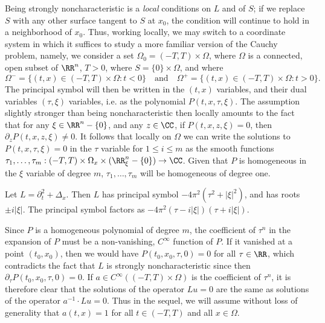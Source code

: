 Being strongly noncharacteristic is a \emph{local} conditions on $L$ and of $S$; if we replace $S$ with any other surface tangent to $S$ at $x_0$, the condition will continue to hold in a neighborhood of $x_0$. Thus, working locally, we may switch to a coordinate system in which it suffices to study a more familiar version of the Cauchy problem, namely, we consider a set $\Omega_0 = (-T,T) \times \Omega$, where $\Omega$ is a connected, open subset of $\RR^n$, $T > 0$, where $S = \{ 0 \} \times \Omega$, and where
%
\[ \Omega^- = \{ (t,x) \in (-T,T) \times \Omega : t < 0 \} \quad\text{and}\quad \Omega^+ = \{ (t,x) \in (-T,T) \times \Omega: t > 0 \}. \]
%
The principal symbol will then be written in the $(t,x)$ variables, and their dual variables $(\tau,\xi)$ variables, i.e. as the polynomial $P(t,x,\tau,\xi)$. The assumption slightly stronger than being noncharacteristic then locally amounts to the fact that for any $\xi \in \RR^n - \{ 0 \}$, and any $z \in \CC$, if $P(t,x,z,\xi) = 0$, then $\partial_z P(t,x,z,\xi) \neq 0$. It follows that locally on $\Omega$ we can write the solutions to $P(t,x,\tau,\xi) = 0$ in the $\tau$ variable for $1 \leq i \leq m$ as the smooth functions $\tau_1,\dots,\tau_m: (-T,T) \times \Omega_x \times (\RR^n_\xi - \{ 0 \}) \to \CC$. Given that $P$ is homogeneous in the $\xi$ variable of degree $m$, $\tau_1,\dots,\tau_m$ will be homogeneous of degree one.

\begin{example}
    Let $L = \partial_t^2 + \Delta_x$. Then $L$ has principal symbol $-4 \pi^2 (\tau^2 + |\xi|^2)$, and has roots $\pm i |\xi|$. The principal symbol factors as $- 4 \pi^2 (\tau - i |\xi|) (\tau + i |\xi|)$.
\end{example}

Since $P$ is a homogeneous polynomial of degree $m$, the coefficient of $\tau^n$ in the expansion of $P$ must be a non-vanishing, $C^\infty$ function of $P$. If it vanished at a point $(t_0,x_0)$, then we would have $P(t_0,x_0,\tau,0) = 0$ for all $\tau \in \RR$, which contradicts the fact that $L$ is strongly noncharacteristic since then $\partial_\tau P(t_0,x_0,\tau,0) = 0$. If $a \in C^\infty((-T,T) \times \Omega)$ is the coefficient of $\tau^n$, it is therefore clear that the solutions of the operator $Lu = 0$ are the same as solutions of the operator $a^{-1} \cdot Lu = 0$. Thus in the sequel, we will assume without loss of generality that $a(t,x) = 1$ for all $t \in (-T,T)$ and all $x \in \Omega$.

